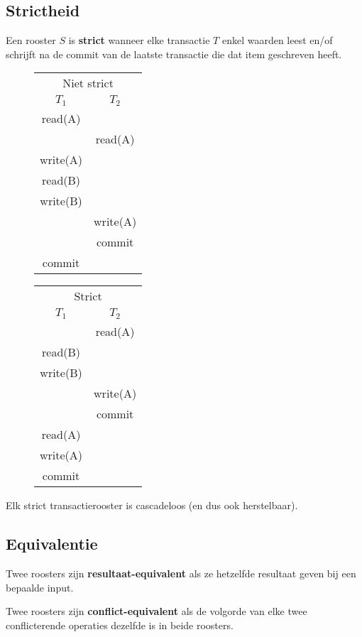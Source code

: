 \documentclass[transacties.tex]{subfiles}
\begin{document}
\subsection{Strictheid}
\begin{de}
Een rooster $S$ is \textbf{strict} wanneer elke transactie $T$ enkel waarden leest en/of schrijft na de commit van de laatste transactie die dat item geschreven heeft.
\end{de}
\begin{figure}[H]
\centering
\begin{tabular}{c|c}
\multicolumn{2}{c}{Niet strict}\\
$T_1$&$T_2$\\
\hline
read(A) &\\
& read(A)\\
write(A)&\\
read(B)&\\
write(B)&\\
&write(A)\\
&commit\\
commit&
\end{tabular}
\begin{tabular}{c|c}
\multicolumn{2}{c}{Strict}\\
$T_1$&$T_2$\\
\hline
& read(A)\\
read(B)&\\
write(B)&\\
& write(A)\\
&commit\\
read(A)&\\
write(A)&\\
commit&
\end{tabular}
\end{figure}
\begin{ei}
Elk strict transactierooster is cascadeloos (en dus ook herstelbaar).
\end{ei}

\subsection{Equivalentie}
\begin{de}
Twee roosters zijn \textbf{resultaat-equivalent} als ze hetzelfde resultaat geven bij een bepaalde input.
\end{de}
\begin{de}
Twee roosters zijn \textbf{conflict-equivalent} als de volgorde van elke twee conflicterende operaties dezelfde is in beide roosters.
\end{de}
\end{document}
